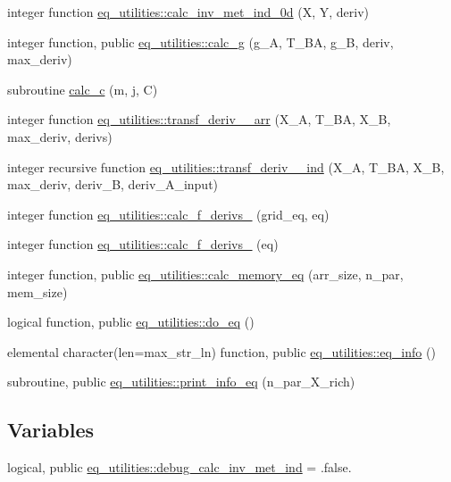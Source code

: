 \begin{DoxyCompactItemize}
\item 
integer function \hyperlink{namespaceeq__utilities_a2994002cd224e90f6bd71c926b09fee2}{eq\+\_\+utilities\+::calc\+\_\+inv\+\_\+met\+\_\+ind\+\_\+0d} (X, Y, deriv)
\item 
integer function, public \hyperlink{namespaceeq__utilities_a1426f7226577f8719472265fd882fbf4}{eq\+\_\+utilities\+::calc\+\_\+g} (g\+\_\+A, T\+\_\+\+BA, g\+\_\+B, deriv, max\+\_\+deriv)
\item 
subroutine \hyperlink{eq__utilities_8f90_aea9f92b0bbcd253100a9d3bc727fd9b4}{calc\+\_\+c} (m, j, C)
\item 
integer function \hyperlink{namespaceeq__utilities_ad7bf3c0a3d42efa072a70e8dffba5451}{eq\+\_\+utilities\+::transf\+\_\+deriv\+\_\+\_\+arr} (X\+\_\+A, T\+\_\+\+BA, X\+\_\+B, max\+\_\+deriv, derivs)
\item 
integer recursive function \hyperlink{namespaceeq__utilities_af86031bb0a0aa17c93d160fe80931be7}{eq\+\_\+utilities\+::transf\+\_\+deriv\+\_\+\_\+ind} (X\+\_\+A, T\+\_\+\+BA, X\+\_\+B, max\+\_\+deriv, deriv\+\_\+B, deriv\+\_\+\+A\+\_\+input)
\item 
integer function \hyperlink{namespaceeq__utilities_aad960e0306e883b83c7a2c6146b48b48}{eq\+\_\+utilities\+::calc\+\_\+f\+\_\+derivs\+\_} (grid\+\_\+eq, eq)
\item 
integer function \hyperlink{namespaceeq__utilities_a9e8269c4f0a20b8b9622fbe8739ba1a8}{eq\+\_\+utilities\+::calc\+\_\+f\+\_\+derivs\+\_} (eq)
\item 
integer function, public \hyperlink{namespaceeq__utilities_a5a9f230ed9a6e627e31e882e9f4a00a1}{eq\+\_\+utilities\+::calc\+\_\+memory\+\_\+eq} (arr\+\_\+size, n\+\_\+par, mem\+\_\+size)
\item 
logical function, public \hyperlink{namespaceeq__utilities_a5109472305101af3a15e8e8717c426fd}{eq\+\_\+utilities\+::do\+\_\+eq} ()
\item 
elemental character(len=max\+\_\+str\+\_\+ln) function, public \hyperlink{namespaceeq__utilities_a34c5ddab45a54a6c738e5e0b8c7d55d6}{eq\+\_\+utilities\+::eq\+\_\+info} ()
\item 
subroutine, public \hyperlink{namespaceeq__utilities_a40f397d20b45432117744ca16870ddbb}{eq\+\_\+utilities\+::print\+\_\+info\+\_\+eq} (n\+\_\+par\+\_\+\+X\+\_\+rich)
\end{DoxyCompactItemize}
\subsection*{Variables}
\begin{DoxyCompactItemize}
\item 
logical, public \hyperlink{namespaceeq__utilities_aedf0e1858d0bd16218a290f4857d416a}{eq\+\_\+utilities\+::debug\+\_\+calc\+\_\+inv\+\_\+met\+\_\+ind} = .false.
\end{DoxyCompactItemize}


